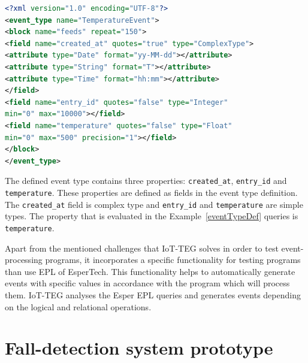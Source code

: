 \documentclass[review]{elsarticle}
\begin{document}
\begin{lstlisting}[basicstyle=\ttfamily\footnotesize,language=XML,caption=Event type definition example,label=eventTypeDef]
<?xml version="1.0" encoding="UTF-8"?>
<event_type name="TemperatureEvent">
<block name="feeds" repeat="150">
<field name="created_at" quotes="true" type="ComplexType">
<attribute type="Date" format="yy-MM-dd"></attribute>
<attribute type="String" format="T"></attribute>
<attribute type="Time" format="hh:mm"></attribute>
</field>
<field name="entry_id" quotes="false" type="Integer" 
min="0" max="10000"></field>
<field name="temperature" quotes="false" type="Float" 
min="0" max="500" precision="1"></field>
</block>
</event_type>
\end{lstlisting}

The defined event type contains three properties: \texttt{created\_at},
\texttt{entry\_id} and \texttt{temperature}. These properties are defined as
fields in the event type definition. The \texttt{created\_at} field is complex
type and \texttt{entry\_id} and \texttt{temperature} are simple types. The
property that is evaluated in the Example~\ref{eventTypeDef} queries is
\texttt{temperature}.

Apart from the mentioned challenges that IoT-TEG solves in order to test 
event-processing programs, it incorporates a specific functionality
for testing programs than use EPL of EsperTech. This functionality helps to 
automatically generate events with specific values in accordance with the 
program which will process them. IoT-TEG analyses the Esper EPL queries and 
generates events depending on the logical and relational operations. 

\section{Fall-detection system prototype}
\label{sec:fall-detectionPrototype}	
\end{document}
